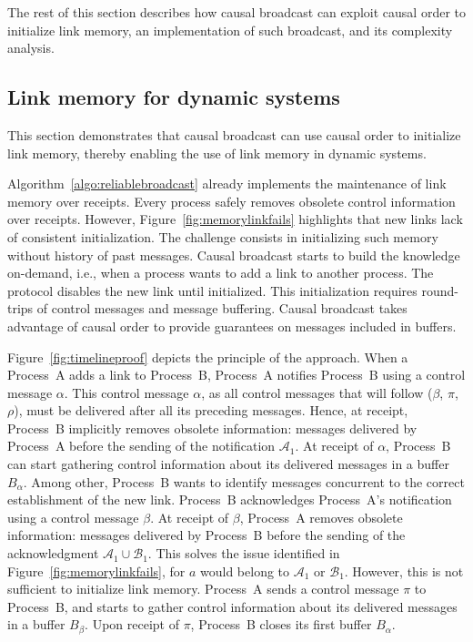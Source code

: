 The rest of this section describes how causal broadcast can exploit causal order
to initialize link memory, an implementation of such broadcast, and its
complexity analysis.


\subsection{Link memory for dynamic systems}

This section demonstrates that causal broadcast can use causal order to
initialize link memory, thereby enabling the use of link memory in dynamic
systems.

Algorithm~\ref{algo:reliablebroadcast} already implements the maintenance of
link memory over receipts. Every process safely removes obsolete control
information over receipts.  However, Figure~\ref{fig:memorylinkfails} highlights
that new links lack of consistent initialization. The challenge consists in
initializing such memory without history of past messages. Causal broadcast
starts to build the knowledge on-demand, i.e., when a process wants to add a
link to another process.  The protocol disables the new link until
initialized. This initialization requires round-trips of control messages and
message buffering.  Causal broadcast takes advantage of causal order to provide
guarantees on messages included in buffers.

Figure~\ref{fig:timelineproof} depicts the principle of the approach. When a
Process~A adds a link to Process~B, Process~A notifies Process~B using a control
message $\alpha$. This control message $\alpha$, as all control messages that
will follow ($\beta$, $\pi$, $\rho$), must be delivered after all its preceding
messages. Hence, at receipt, Process~B implicitly removes obsolete information:
messages delivered by Process~A before the sending of the notification
$\mathcal{A}_1$.  At receipt of $\alpha$, Process~B can start gathering control
information about its delivered messages in a buffer $B_\alpha$. Among other,
Process~B wants to identify messages concurrent to the correct establishment of
the new link. Process~B acknowledges Process~A's notification using a control
message $\beta$. At receipt of $\beta$, Process~A removes obsolete information:
messages delivered by Process~B before the sending of the acknowledgment
$\mathcal{A}_1 \cup \mathcal{B}_1$. This solves the issue identified in
Figure~\ref{fig:memorylinkfails}, for $a$ would belong to $\mathcal{A}_1$ or
$\mathcal{B}_1$. However, this is not sufficient to initialize link memory.
Process~A sends a control message $\pi$ to Process~B, and starts to gather
control information about its delivered messages in a buffer $B_\beta$. Upon
receipt of $\pi$, Process~B closes its first buffer $B_\alpha$.

